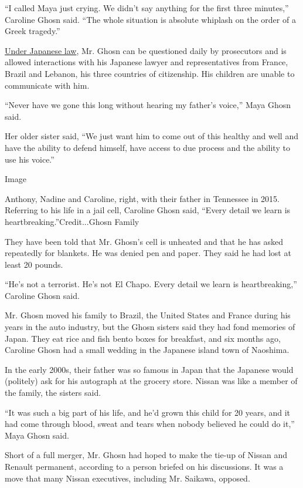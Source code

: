 ``I called Maya just crying. We didn't say anything for the first three
minutes,'' Caroline Ghosn said. ``The whole situation is absolute
whiplash on the order of a Greek tragedy.''

\href{https://www.nytimes.com/2018/12/19/business/carlos-ghosn-jail.html}{Under
Japanese law}, Mr. Ghosn can be questioned daily by prosecutors and is
allowed interactions with his Japanese lawyer and representatives from
France, Brazil and Lebanon, his three countries of citizenship. His
children are unable to communicate with him.

``Never have we gone this long without hearing my father's voice,'' Maya
Ghosn said.

Her older sister said, ``We just want him to come out of this healthy
and well and have the ability to defend himself, have access to due
process and the ability to use his voice.''

Image

Anthony, Nadine and Caroline, right, with their father in Tennessee in
2015. Referring to his life in a jail cell, Caroline Ghosn said, ``Every
detail we learn is heartbreaking.''Credit...Ghosn Family

They have been told that Mr. Ghosn's cell is unheated and that he has
asked repeatedly for blankets. He was denied pen and paper. They said he
had lost at least 20 pounds.

``He's not a terrorist. He's not El Chapo. Every detail we learn is
heartbreaking,'' Caroline Ghosn said.

Mr. Ghosn moved his family to Brazil, the United States and France
during his years in the auto industry, but the Ghosn sisters said they
had fond memories of Japan. They eat rice and fish bento boxes for
breakfast, and six months ago, Caroline Ghosn had a small wedding in the
Japanese island town of Naoshima.

In the early 2000s, their father was so famous in Japan that the
Japanese would (politely) ask for his autograph at the grocery store.
Nissan was like a member of the family, the sisters said.

``It was such a big part of his life, and he'd grown this child for 20
years, and it had come through blood, sweat and tears when nobody
believed he could do it,'' Maya Ghosn said.

Short of a full merger, Mr. Ghosn had hoped to make the tie-up of Nissan
and Renault permanent, according to a person briefed on his discussions.
It was a move that many Nissan executives, including Mr. Saikawa,
opposed.

